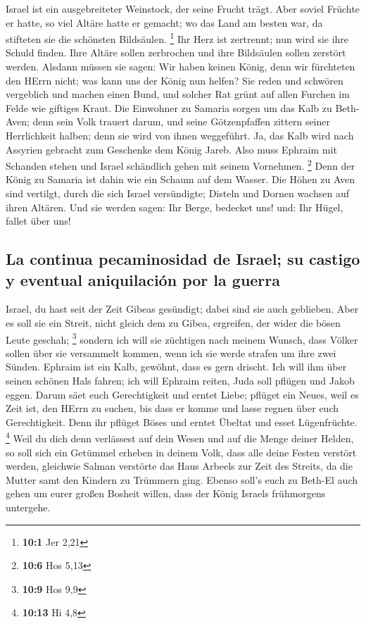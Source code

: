  Israel ist ein ausgebreiteter Weinstock, der seine Frucht
trägt. Aber soviel Früchte er hatte, so viel Altäre hatte er gemacht; wo
das Land am besten war, da stifteten sie die schönsten Bildsäulen.
\footnote{\textbf{10:1} Jer 2,21}  Ihr Herz ist zertrennt;
nun wird sie ihre Schuld finden. Ihre Altäre sollen zerbrochen und ihre
Bildsäulen sollen zerstört werden.  Alsdann müssen sie
sagen: Wir haben keinen König, denn wir fürchteten den HErrn nicht; was
kann uns der König nun helfen?  Sie reden und schwören
vergeblich und machen einen Bund, und solcher Rat grünt auf allen
Furchen im Felde wie giftiges Kraut.  Die Einwohner zu
Samaria sorgen um das Kalb zu Beth-Aven; denn sein Volk trauert darum,
und seine Götzenpfaffen zittern seiner Herrlichkeit halben; denn sie
wird von ihnen weggeführt.  Ja, das Kalb wird nach
Assyrien gebracht zum Geschenke dem König Jareb. Also muss Ephraim mit
Schanden stehen und Israel schändlich gehen mit seinem Vornehmen.
\footnote{\textbf{10:6} Hos 5,13}  Denn der König zu
Samaria ist dahin wie ein Schaum auf dem Wasser.  Die
Höhen zu Aven sind vertilgt, durch die sich Israel versündigte; Disteln
und Dornen wachsen auf ihren Altären. Und sie werden sagen: Ihr Berge,
bedecket uns! und: Ihr Hügel, fallet über uns!

\hypertarget{la-continua-pecaminosidad-de-israel-su-castigo-y-eventual-aniquilaciuxf3n-por-la-guerra}{%
\subsection{La continua pecaminosidad de Israel; su castigo y eventual
aniquilación por la
guerra}\label{la-continua-pecaminosidad-de-israel-su-castigo-y-eventual-aniquilaciuxf3n-por-la-guerra}}

 Israel, du hast seit der Zeit Gibeas gesündigt; dabei
sind sie auch geblieben. Aber es soll sie ein Streit, nicht gleich dem
zu Gibea, ergreifen, der wider die bösen Leute geschah; \footnote{\textbf{10:9}
  Hos 9,9}  sondern ich will sie züchtigen nach meinem
Wunsch, dass Völker sollen über sie versammelt kommen, wenn ich sie
werde strafen um ihre zwei Sünden.  Ephraim ist ein Kalb,
gewöhnt, dass es gern drischt. Ich will ihm über seinen schönen Hals
fahren; ich will Ephraim reiten, Juda soll pflügen und Jakob eggen.
 Darum säet euch Gerechtigkeit und erntet Liebe; pflüget
ein Neues, weil es Zeit ist, den HErrn zu suchen, bis dass er komme und
lasse regnen über euch Gerechtigkeit.  Denn ihr pflüget
Böses und erntet Übeltat und esset Lügenfrüchte. \footnote{\textbf{10:13}
  Hi 4,8}  Weil du dich denn verlässest auf dein Wesen
und auf die Menge deiner Helden, so soll sich ein Getümmel erheben in
deinem Volk, dass alle deine Festen verstört werden, gleichwie Salman
verstörte das Haus Arbeels zur Zeit des Streits, da die Mutter samt den
Kindern zu Trümmern ging.  Ebenso soll's euch zu Beth-El
auch gehen um eurer großen Bosheit willen, dass der König Israels
frühmorgens untergehe.

